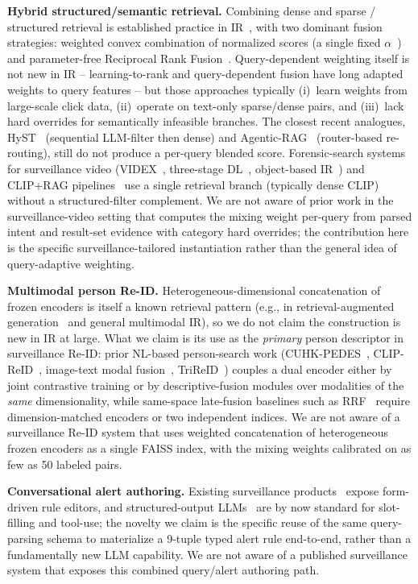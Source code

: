 ﻿\documentclass[conference]{IEEEtran}
\theoremstyle{definition}
\begin{document}
\textbf{Hybrid structured/semantic retrieval.} Combining dense and sparse / structured retrieval is established practice in IR~\cite{b25,b27,b29}, with two dominant fusion strategies: weighted convex combination of normalized scores (a single fixed $\alpha$~\cite{b29}) and parameter-free Reciprocal Rank Fusion~\cite{b27}. Query-dependent weighting itself is not new in IR -- learning-to-rank and query-dependent fusion have long adapted weights to query features -- but those approaches typically (i)~learn weights from large-scale click data, (ii)~operate on text-only sparse/dense pairs, and (iii)~lack hard overrides for semantically infeasible branches. The closest recent analogues, HyST~\cite{b30} (sequential LLM-filter then dense) and Agentic-RAG~\cite{b3} (router-based re-routing), still do not produce a per-query blended score. Forensic-search systems for surveillance video (VIDEX~\cite{b7}, three-stage DL~\cite{b12}, object-based IR~\cite{b11}) and CLIP+RAG pipelines~\cite{b1,b19} use a single retrieval branch (typically dense CLIP) without a structured-filter complement. We are not aware of prior work in the surveillance-video setting that computes the mixing weight per-query from parsed intent and result-set evidence with category hard overrides; the contribution here is the specific surveillance-tailored instantiation rather than the general idea of query-adaptive weighting.

\textbf{Multimodal person Re-ID.} Heterogeneous-dimensional concatenation of frozen encoders is itself a known retrieval pattern (e.g., in retrieval-augmented generation~\cite{b4} and general multimodal IR), so we do not claim the construction is new in IR at large. What we claim is its use as the \emph{primary} person descriptor in surveillance Re-ID: prior NL-based person-search work (CUHK-PEDES~\cite{b32}, CLIP-ReID~\cite{b33}, image-text modal fusion~\cite{b34}, TriReID~\cite{b35}) couples a dual encoder either by joint contrastive training or by descriptive-fusion modules over modalities of the \emph{same} dimensionality, while same-space late-fusion baselines such as RRF~\cite{b27} require dimension-matched encoders or two independent indices. We are not aware of a surveillance Re-ID system that uses weighted concatenation of heterogeneous frozen encoders as a single FAISS index, with the mixing weights calibrated on as few as 50 labeled pairs.

\textbf{Conversational alert authoring.} Existing surveillance products~\cite{b7,b8,b12} expose form-driven rule editors, and structured-output LLMs~\cite{b20} are by now standard for slot-filling and tool-use; the novelty we claim is the specific reuse of the same query-parsing schema to materialize a 9-tuple typed alert rule end-to-end, rather than a fundamentally new LLM capability. We are not aware of a published surveillance system that exposes this combined query/alert authoring path.
\end{document}

